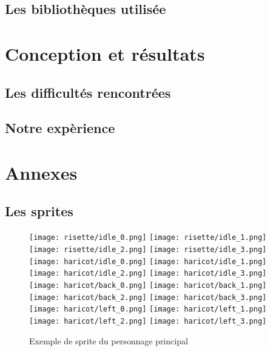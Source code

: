 \documentclass{article}
\begin{document}
\subsection{Les bibliothèques utilisée}
\section{Conception et résultats}
\subsection{Les difficultés rencontrées}
\subsection{Notre expèrience}
\section{Annexes}
\subsection{Les sprites}
\begin{figure}[h]
    \centering
    \texttt{[image: risette/idle\_0.png]}
    \texttt{[image: risette/idle\_1.png]}
    \texttt{[image: risette/idle\_2.png]}
    \texttt{[image: risette/idle\_3.png]}
    \\
    \texttt{[image: haricot/idle\_0.png]}
    \texttt{[image: haricot/idle\_1.png]}
    \texttt{[image: haricot/idle\_2.png]}
    \texttt{[image: haricot/idle\_3.png]}
    \\
    \texttt{[image: haricot/back\_0.png]}
    \texttt{[image: haricot/back\_1.png]}
    \texttt{[image: haricot/back\_2.png]}
    \texttt{[image: haricot/back\_3.png]}
    \\
    \texttt{[image: haricot/left\_0.png]}
    \texttt{[image: haricot/left\_1.png]}
    \texttt{[image: haricot/left\_2.png]}
    \texttt{[image: haricot/left\_3.png]}
    \caption{Exemple de sprite du personnage principal}\label{lapin_devant}
\end{figure}
\end{document}
